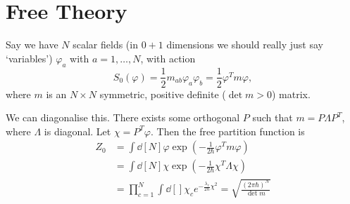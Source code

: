 \section{Free Theory}%
\label{sec:free_theory}

Say we have $N$ scalar fields (in $0+1$ dimensions we should really just say `variables') $\varphi_{a}$ with $a = 1, \dots, N$, with action
\begin{equation}
  S_0 (\varphi) = \frac{1}{2} m_{ab} \varphi_{a} \varphi_{b} = \frac{1}{2} \varphi^T m \varphi,
\end{equation}
where $m$ is an $N \times N$ symmetric, positive definite ($\det m > 0$) matrix.

We can diagonalise this. There exists some orthogonal $P$ such that $m = P \Lambda P^T$, where $\Lambda$ is diagonal.
Let $\chi = P^T \varphi$. Then the free partition function is
\begin{align}
  Z_0 &= \int \dd[N]{\varphi} \exp(-\frac{1}{2 \hbar} \varphi^T m \varphi) \\
      &= \int \dd[N]{\chi} \exp(- \frac{1}{2 \hbar} \chi^T \Lambda \chi) \\
      &= \prod_{c=1}^N \int \dd[]{\chi_c} e^{-\frac{\lambda_c}{2 \hbar} \chi^2} = \sqrt{\frac{(2 \pi \hbar)^N}{\det m}}
\end{align}

